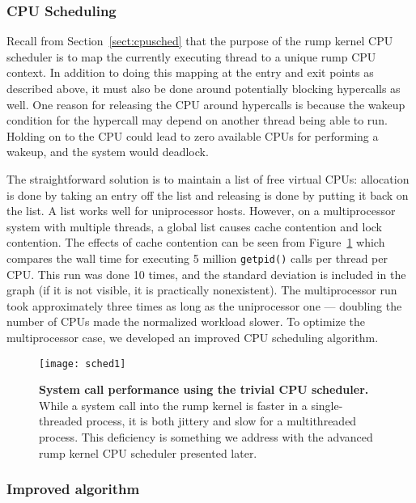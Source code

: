 \subsubsection{CPU Scheduling}
\label{sect:cpuschedimpl}

Recall from Section~\ref{sect:cpusched} that the purpose of the
rump kernel CPU scheduler is to map the currently executing thread
to a unique rump CPU context.  In addition to doing this mapping at the
entry and exit points as described above, it must also be done
around potentially blocking hypercalls as well.  One reason
for releasing the CPU around hypercalls is because the wakeup
condition for the hypercall may depend on another thread being able
to run.  Holding on to the CPU could lead to zero available CPUs
for performing a wakeup, and the system would deadlock.

The straightforward solution is to maintain a list of free virtual
CPUs: allocation is done by taking an entry off the list and
releasing is done by putting it back on the list.  A list works well
for uniprocessor hosts.  However, on a multiprocessor system with
multiple threads, a global list causes cache contention and lock
contention.  The effects of cache contention can be seen from
Figure~\ref{fig:syscall_simple} which compares the wall time for executing
5 million \verb+getpid()+ calls per thread per CPU.  This run was done
10 times, and the standard deviation is included in the graph (if it
is not visible, it is practically nonexistent).  The multiprocessor
run took approximately three times as long as the uniprocessor one ---
doubling the number of CPUs made the normalized workload slower.
To optimize the multiprocessor case, we developed an improved CPU
scheduling algorithm.

\begin{figure}[h!]
\texttt{[image: sched1]}
\caption[System call performance using the trivial CPU scheduler]{
\textbf{System call performance using the trivial CPU scheduler.}
While a system call into the rump kernel is faster in a single-threaded
process, it is both jittery and slow for a multithreaded process.
This deficiency is something we address with the advanced rump kernel
CPU scheduler presented later.
}
\label{fig:syscall_simple}
\end{figure}

\subsubsection*{Improved algorithm}

